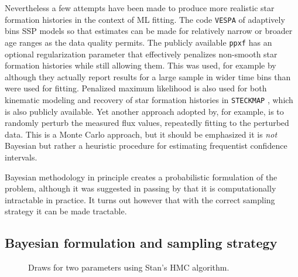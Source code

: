 \documentclass[modern]{aastex62}
\begin{document}
Nevertheless a few attempts have been made to produce more realistic star formation histories in the context of ML fitting. The code \texttt{VESPA} of \citet{2007MNRAS.381.1252T} adaptively bins SSP models so that estimates can be made for relatively narrow or broader age ranges as the data quality permits. The publicly available \texttt{ppxf} \citep{2004PASP..116..138C, 2017MNRAS.466..798C} has an optional regularization parameter that effectively penalizes non-smooth star formation histories while still allowing them. This was used, for example by \citet{2015MNRAS.448.3484M} although they actually report results for a large sample in wider time bins than were used for fitting. Penalized maximum likelihood is also used for both kinematic modeling and recovery of star formation histories in \texttt{STECKMAP} \citep{2006MNRAS.365...46O, 2006MNRAS.365...74O, 2011arXiv1108.4631O}, which is also publicly available. Yet another approach adopted by, for example, \citet{2016RMxAA..52..171S} is to randomly perturb the measured flux values, repeatedly fitting to the perturbed data. This is a Monte Carlo approach, but it should be emphasized it is \emph{not} Bayesian but rather a heuristic procedure for estimating frequentist confidence intervals.

Bayesian methodology in principle creates a probabilistic formulation of the problem, although it was suggested in passing by \citet{2017MNRAS.466..798C} that it is computationally intractable in practice. It turns out however that with the correct sampling strategy it can be made tractable.

\subsection{Bayesian formulation and sampling strategy}
\label{sec:bayes}

\begin{figure}[h]
\caption{Draws for two parameters using Stan's HMC algorithm.}
\label{fig:traceplots}
\end{figure}
\end{document}
